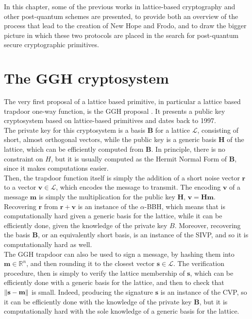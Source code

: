 In this chapter, some of the previous works in lattice-based cryptography and other post-quantum schemes are presented, to provide both an overview of the process that lead to the creation of New Hope and Frodo, and to draw the bigger picture in which these two protocols are placed in the search for post-quantum secure cryptographic primitives.

\section{The GGH cryptosystem}
The very first proposal of a lattice based primitive, in particular a lattice based trapdoor one-way function, is the GGH proposal \cite{GGH}. It presents a public key cryptosystem based on lattice-based primitives and dates back to 1997.\\
The private key for this cryptosystem is a basis $\mathbf{B}$ for a lattice $\mathscr{L}$, consisting of short, almost orthogonal vectors, while the public key is a generic basis $\mathbf{H}$ of the lattice, which can be efficiently computed from $\mathbf{B}$. In principle, there is no constraint on $H$, but it is usually computed as the Hermit Normal Form of $\mathbf{B}$, since it makes computations easier.\\
Then, the trapdoor function itself is simply the addition of a short noise vector $\mathbf{r}$ to a vector $\mathbf{v}\in\mathscr{L}$, which encodes the message to transmit. The encoding $\mathbf{v}$ of a message $\mathbf{m}$ is simply the multiplication for the public key $\mathbf{H}$,  $\mathbf{v}=\mathbf{H}\mathbf{m}$. Recovering $\mathbf{r}$ from $\mathbf{r}+\mathbf{v}$ is an instance of the $\alpha$-BBH, which means that is computationally hard given a generic basis for the lattice, while it can be efficiently done, given the knowledge of the private key $B$.
Moreover, recovering the basis $\mathbf{B}$, or an equivalently short basis, is an instance of the SIVP, and so it is computationally hard as well.\\
The GGH trapdoor can also be used to sign a message, by hashing them into $\mathbf{m}\in\mathbb{R}^n$, and then rounding it to the closest vector $\mathbf{s}\in\mathscr{L}$. The verification procedure, then is simply to verify the lattice membership of $\mathbf{s}$, which can be efficiently done with a generic basis for the lattice, and then to check that $\left\lVert \mathbf{s}-\mathbf{m} \right\rVert$ is small. Indeed, producing the signature $\mathbf{s}$ is an instance of the CVP, so it can be efficiently done with the knowledge of the private key $\mathbf{B}$, but it is computationally hard with the sole knowledge of a generic basis for the lattice.\\
